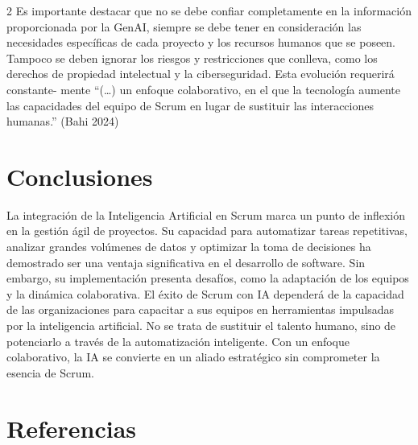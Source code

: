 \documentclass[12pt,spanish,Letterpaper,openany]{book}
\begin{document}
\begin {multicols}{2}
Es importante destacar que no se debe confiar completamente en la información
proporcionada por la GenAI, siempre se debe tener en consideración las necesidades
específicas de cada proyecto y los recursos humanos que se poseen. Tampoco se deben
ignorar los riesgos y restricciones que conlleva, como los derechos de propiedad intelectual
y la ciberseguridad. Esta evolución requerirá constante-
mente ``(\ldots{}) un enfoque colaborativo,
en el que la tecnología aumente las capacidades del equipo de Scrum en lugar de sustituir
las interacciones humanas.'' (Bahi 2024)

\hypertarget{conclusiones-3}{%
\section{Conclusiones}\label{conclusiones-3}}

La integración de la Inteligencia Artificial en Scrum marca un punto de inflexión en
la gestión ágil de proyectos. Su capacidad para automatizar tareas repetitivas, analizar
grandes volúmenes de datos y optimizar la toma de decisiones ha demostrado ser una ventaja
significativa en el desarrollo de software. Sin embargo, su implementación presenta desafíos,
como la adaptación de los equipos y la dinámica colaborativa. El éxito de Scrum con IA
dependerá de la capacidad de las organizaciones para capacitar a sus equipos en herramientas
impulsadas por la inteligencia artificial. No se trata de sustituir el talento humano, sino de
potenciarlo a través de la automatización inteligente. Con un enfoque colaborativo, la IA se
convierte en un aliado estratégico sin comprometer la esencia de Scrum.

\hypertarget{referencias-3}{%
\section{Referencias}\label{referencias-3}}


\end{multicols}
\end{document}
